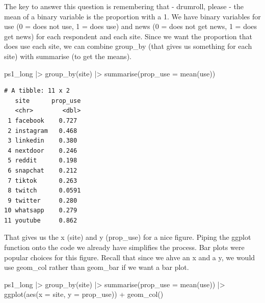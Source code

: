 \documentclass[
  letterpaper,
  DIV=11,
  numbers=noendperiod]{scrartcl}
\newenvironment{Shaded}{\begin{snugshade}}{\end{snugshade}}
\newcommand{\AttributeTok}[1]{\textcolor[rgb]{0.40,0.45,0.13}{#1}}
\newcommand{\FunctionTok}[1]{\textcolor[rgb]{0.28,0.35,0.67}{#1}}
\newcommand{\NormalTok}[1]{\textcolor[rgb]{0.00,0.23,0.31}{#1}}
\newcommand{\SpecialCharTok}[1]{\textcolor[rgb]{0.37,0.37,0.37}{#1}}
\begin{document}
The key to answer this question is remembering that - drumroll, please -
the mean of a binary variable is the proportion with a 1. We have binary
variables for use (0 = does not use, 1 = does use) and news (0 = does
not get news, 1 = does get news) for each respondent and each site.
Since we want the proportion that does use each site, we can combine
group\_by (that gives us something for each site) with summarise (to get
the means).

\begin{Shaded}
\begin{Highlighting}[]
\NormalTok{ps1\_long }\SpecialCharTok{|\textgreater{}} 
  \FunctionTok{group\_by}\NormalTok{(site) }\SpecialCharTok{|\textgreater{}} 
  \FunctionTok{summarise}\NormalTok{(}\AttributeTok{prop\_use =} \FunctionTok{mean}\NormalTok{(use))}
\end{Highlighting}
\end{Shaded}

\begin{verbatim}
# A tibble: 11 x 2
   site      prop_use
   <chr>        <dbl>
 1 facebook    0.727 
 2 instagram   0.468 
 3 linkedin    0.380 
 4 nextdoor    0.246 
 5 reddit      0.198 
 6 snapchat    0.212 
 7 tiktok      0.263 
 8 twitch      0.0591
 9 twitter     0.280 
10 whatsapp    0.279 
11 youtube     0.862 
\end{verbatim}

That gives us the x (site) and y (prop\_use) for a nice figure. Piping
the ggplot function onto the code we already have simplifies the
process. Bar plots were popular choices for this figure. Recall that
since we ahve an x and a y, we would use geom\_col rather than geom\_bar
if we want a bar plot.

\begin{Shaded}
\begin{Highlighting}[]
\NormalTok{ps1\_long }\SpecialCharTok{|\textgreater{}} 
  \FunctionTok{group\_by}\NormalTok{(site) }\SpecialCharTok{|\textgreater{}} 
  \FunctionTok{summarise}\NormalTok{(}\AttributeTok{prop\_use =} \FunctionTok{mean}\NormalTok{(use)) }\SpecialCharTok{|\textgreater{}} 
  \FunctionTok{ggplot}\NormalTok{(}\FunctionTok{aes}\NormalTok{(}\AttributeTok{x =}\NormalTok{ site, }\AttributeTok{y =}\NormalTok{ prop\_use)) }\SpecialCharTok{+} \FunctionTok{geom\_col}\NormalTok{()}
\end{Highlighting}
\end{Shaded}
\end{document}
